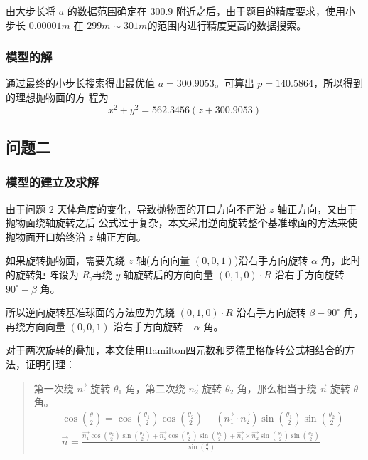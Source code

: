 \documentclass[withoutpreface,bwprint]{cumcmthesis} %
\begin{document}
由大步长将 $a$ 的数据范围确定在 $300.9$ 附近之后，由于题目的精度要求，使用小步长 $0.00001m$ 在
$299m \sim 301m$的范围内进行精度更高的数据搜索。
\subsubsection{模型的解}
通过最终的小步长搜索得出最优值 $a = 300.9053$。可算出 $p = 140.5864$，所以得到的理想抛物面的方
程为
\[
    x^2 + y^2 = 562.3456(z + 300.9053)
\]
\subsection{问题二}
\subsubsection{模型的建立及求解}
由于问题 $2$ 天体角度的变化，导致抛物面的开口方向不再沿 $z$ 轴正方向，又由于抛物面绕轴旋转之后
公式过于复杂，本文采用逆向旋转整个基准球面的方法来使抛物面开口始终沿 $z$ 轴正方向。

如果旋转抛物面，需要先绕 $z$ 轴(方向向量 $(0,0,1)$)沿右手方向旋转 $\alpha$ 角，此时的旋转矩
阵设为 $R$,再绕 $y$ 轴旋转后的方向向量 $(0,1,0)\cdot R$ 沿右手方向旋转 $90^\circ-\beta$
角。

所以逆向旋转基准球面的方法应为先绕 $(0,1,0)\cdot R$ 沿右手方向旋转 $\beta-90^\circ$ 角，
再绕方向向量 $(0,0,1)$ 沿右手方向旋转 $-\alpha$ 角。

对于两次旋转的叠加，本文使用Hamilton四元数和罗德里格旋转公式相结合的方法，证明引理：
\begin{quote}
    第一次绕 $\overrightarrow{n_1}$ 旋转 $\theta _1$ 角，第二次绕 $\overrightarrow{n_2}$
    旋转 $\theta _2$ 角，那么相当于绕 $\overrightarrow{n}$ 旋转 $\theta$ 角。
    \[
        \begin{split}
            &\cos(\frac{\theta}{2}) = \cos(\frac{\theta _1}{2})
            \cos(\frac{\theta _2}{2}) - (\overrightarrow{n_1} \cdot 
            \overrightarrow{n_2})\sin(\frac{\theta _1}{2})
            \sin(\frac{\theta _2}{2}) \\
            &\overrightarrow{n} = \frac{\displaystyle \overrightarrow{n_1}
            \cos(\frac{\theta _2}{2})\sin(\frac{\theta _1}{2}) + 
            \overrightarrow{n_2}\cos(\frac{\theta _1}{2})
            \sin(\frac{\theta _2}{2}) + \overrightarrow{n_1} \times 
            \overrightarrow{n_2}\sin(\frac{\theta _1}{2})
            \sin(\frac{\theta _2}{2})}
            {\displaystyle \sin(\frac{\theta}{2})} 
        \end{split}
    \]
\end{quote}
\end{document}
